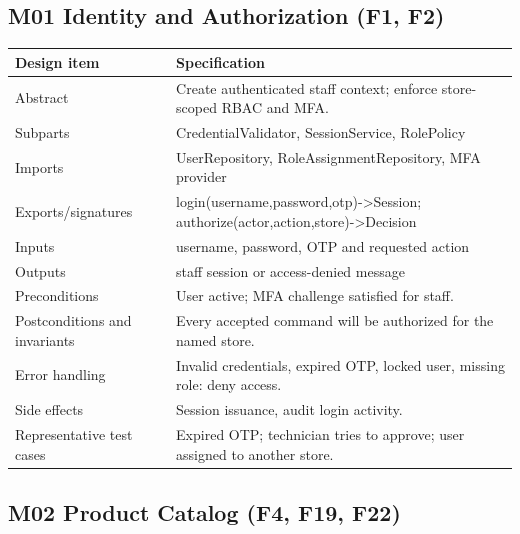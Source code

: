 \subsection{M01 Identity and Authorization (F1, F2)}\label{m01-identity-and-authorization-f1-f2}

{\def\LTcaptype{none} %
\begin{longtable}[]{|
  >{\raggedright\arraybackslash}m{}|
  >{\raggedright\arraybackslash}m{}|}
\hline
\begin{minipage}[c]{\linewidth}\raggedright
\textbf{Design item}
\end{minipage} & \begin{minipage}[c]{\linewidth}\raggedright
\textbf{Specification}
\end{minipage} \\
\hline
\endhead

\endlastfoot
Abstract & Create authenticated staff context; enforce store-scoped RBAC and MFA. \\ \hline
Subparts & CredentialValidator, SessionService, RolePolicy \\ \hline
Imports & UserRepository, RoleAssignmentRepository, MFA provider \\ \hline
Exports/signatures & login(username,password,otp)-\textgreater Session; authorize(actor,action,store)-\textgreater Decision \\ \hline
Inputs & username, password, OTP and requested action \\ \hline
Outputs & staff session or access-denied message \\ \hline
Preconditions & User active; MFA challenge satisfied for staff. \\ \hline
Postconditions and invariants & Every accepted command will be authorized for the named store. \\ \hline
Error handling & Invalid credentials, expired OTP, locked user, missing role: deny access. \\ \hline
Side effects & Session issuance, audit login activity. \\ \hline
Representative test cases & Expired OTP; technician tries to approve; user assigned to another store. \\ \hline
\end{longtable}
}

\subsection{M02 Product Catalog (F4, F19, F22)}\label{m02-product-catalog-f4-f19-f22}

